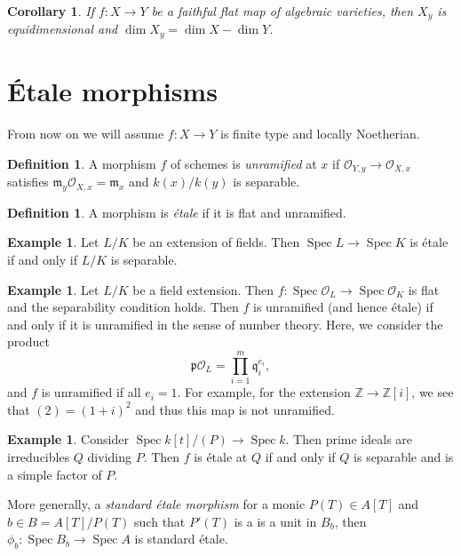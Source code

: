 \documentclass[leqno, openany]{memoir}
\newtheorem{cor}[thm]{Corollary}
\theoremstyle{definition}
\newtheorem{defn}[thm]{Definition}
\newtheorem{exm}[thm]{Example}
\theoremstyle{remark}
\theoremstyle{plain}
\theoremstyle{definition}
\theoremstyle{remark}
\newcommand{\Z}{\mathbb{Z}}
\newcommand{\mc}[1]{\mathcal{#1}}
\newcommand{\mf}[1]{\mathfrak{#1}}
\DeclareMathOperator{\Spec}{Spec}
\begin{document}
\begin{cor} If $f \colon X \to Y$ be a faithful flat map of algebraic
varieties, then $X_y$ is equidimensional and $\dim X_y = \dim X - \dim Y$.
\end{cor}

\section{\'Etale morphisms}%

From now on we will assume $f \colon X \to Y$ is finite type and locally
Noetherian. 

\begin{defn} A morphism $f$ of schemes is \textit{unramified} at $x$ if
$\mc{O}_{Y,y} \to \mc{O}_{X,x}$ satisfies $\mf{m}_y \mc{O}_{X,x} = \mf{m}_x$
and $k(x) / k(y)$ is separable.  \end{defn}

\begin{defn} A morphism is \textit{\'etale} if it is flat and unramified.
\end{defn}

\begin{exm} Let $L/K$ be an extension of fields. Then $\Spec L \to \Spec K$ is
\'etale if and only if $L/K$ is separable.  \end{exm}

\begin{exm} Let $L/K$ be a field extension. Then $f \colon \Spec \mc{O}_L \to
    \Spec \mc{O}_K$ is flat and the separability condition holds. Then $f$ is
    unramified (and hence \'etale) if and only if it is unramified in the sense
    of number theory. Here, we consider the product \[ \mf{p} \mc{O}_L =
    \prod_{i=1}^m \mf{q}_i^{e_i}, \] and $f$ is unramified if all $e_i = 1$.
    For example, for the extension $\Z \to \Z[i]$, we see that $(2) = (1+i)^2$
    and thus this map is not unramified.  \end{exm}

\begin{exm} Consider $\Spec k[t]/(P) \to \Spec k$. Then prime ideals are
    irreducibles $Q$ dividing $P$. Then $f$ is \'etale at $Q$ if and only if
    $Q$ is separable and is a simple factor of $P$.

    More generally, a \textit{standard \'etale morphism} for a monic $P(T) \in
A[T]$ and $b \in B = A[T]/P(T)$ such that $P'(T)$ is a is a unit in $B_b$, then
$\phi_b \colon \Spec B_b \to \Spec A$ is standard \'etale.  \end{exm}
\end{document}
